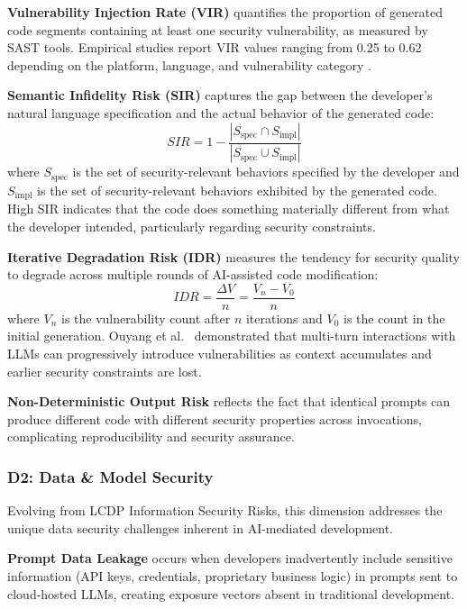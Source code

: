 \documentclass[preprint,review,12pt]{elsarticle}
\newcommand{\sir}{\textit{SIR}}
\newcommand{\idr}{\textit{IDR}}
\begin{document}
\textbf{Vulnerability Injection Rate (VIR)} quantifies the proportion of generated code segments containing at least one security vulnerability, as measured by SAST tools. Empirical studies report VIR values ranging from 0.25 to 0.62 depending on the platform, language, and vulnerability category \cite{pearce2022asleep, tony2023llmseceval, fu2023security}.

\textbf{Semantic Infidelity Risk (SIR)} captures the gap between the developer's natural language specification and the actual behavior of the generated code:
\begin{equation}
    \sir = 1 - \frac{|S_{\text{spec}} \cap S_{\text{impl}}|}{|S_{\text{spec}} \cup S_{\text{impl}}|}
    \label{eq:sir}
\end{equation}
where $S_{\text{spec}}$ is the set of security-relevant behaviors specified by the developer and $S_{\text{impl}}$ is the set of security-relevant behaviors exhibited by the generated code. High SIR indicates that the code does something materially different from what the developer intended, particularly regarding security constraints.

\textbf{Iterative Degradation Risk (IDR)} measures the tendency for security quality to degrade across multiple rounds of AI-assisted code modification:
\begin{equation}
    \idr = \frac{\Delta V}{n} = \frac{V_n - V_0}{n}
    \label{eq:idr}
\end{equation}
where $V_n$ is the vulnerability count after $n$ iterations and $V_0$ is the count in the initial generation. Ouyang et al.\ \cite{ouyang2025iterative} demonstrated that multi-turn interactions with LLMs can progressively introduce vulnerabilities as context accumulates and earlier security constraints are lost.

\textbf{Non-Deterministic Output Risk} reflects the fact that identical prompts can produce different code with different security properties across invocations, complicating reproducibility and security assurance.


\subsubsection{D2: Data \& Model Security}
\label{subsubsec:d2}

Evolving from LCDP Information Security Risks, this dimension addresses the unique data security challenges inherent in AI-mediated development.

\textbf{Prompt Data Leakage} occurs when developers inadvertently include sensitive information (API keys, credentials, proprietary business logic) in prompts sent to cloud-hosted LLMs, creating exposure vectors absent in traditional development.
\end{document}
